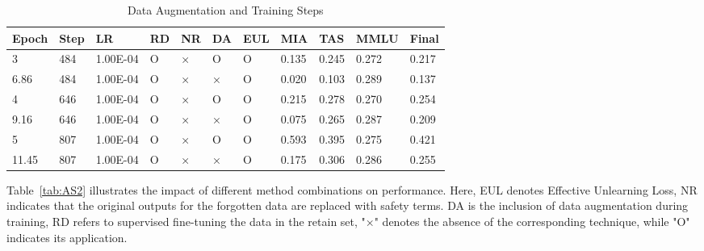 \documentclass[11pt]{article}
\begin{document}
\begin{table}[!ht]
  \centering
    \begin{tabular}{|l|l|l|l|l|l|l|l|l|l|l|}
    \hline
        Epoch & Step & LR & RD & NR & DA & EUL & MIA & TAS & MMLU & Final \\ \hline
        3 & 484 & 1.00E-04 & O & × & O & O & 0.135 & 0.245 & 0.272 & 0.217 \\ \hline
        6.86 & 484 & 1.00E-04 & O & × & × & O & 0.020 & 0.103 & 0.289 & 0.137 \\ \hline
        4 & 646 & 1.00E-04 & O & × & O & O & 0.215 & 0.278 & 0.270 & 0.254 \\ \hline
        9.16 & 646 & 1.00E-04 & O & × & × & O & 0.075 & 0.265 & 0.287 & 0.209 \\ \hline
        5 & 807 & 1.00E-04 & O & × & O & O & 0.593 & 0.395 & 0.275 & 0.421 \\ \hline
        11.45 & 807 & 1.00E-04 & O & × & × & O & 0.175 & 0.306 & 0.286 & 0.255 \\ \hline
    \end{tabular}
  \caption{
    Data Augmentation and Training Steps }
\label{tab:DA_TS}
\end{table}



Table~\ref{tab:AS2} illustrates the impact of different method combinations on performance. Here, EUL denotes Effective Unlearning Loss, NR indicates that the original outputs for the forgotten data are replaced with safety terms. DA is the inclusion of data augmentation during training, RD refers to supervised fine-tuning the data in the retain set,
"×" denotes the absence of the corresponding technique, while "O" indicates its application.
\end{document}
